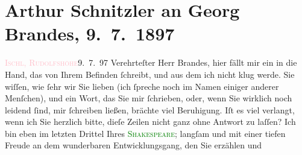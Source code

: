 

               \section[Arthur Schnitzler an Georg Brandes, 9. 7. 1897]{ Arthur Schnitzler an Georg Brandes, 9. 7. 1897}\nopagebreak{}\rehead{ }\normalsize\beginnumbering{} \toendnotes[C]{\smallbreak\pagebreak[2]} 
\toendnotes[C]{\smallbreak}\pstart
           \raggedleft{}{\pb}\textcolor{pink}{\textsc{Ischl, Rudolfshöhe}}{}\ledrightnote{\textcolor{pink}{Hotel und Pension Rudolfshöhe (Leopold Petter)}}{ }9. 7. 97\pend
           \pstart{}Verehrteſter Herr Brandes,\pend\pstart
           hier fällt mir ein \label{K_L00696_1v}\label{K_L00696_1h} in die Hand, das von Ihrem Befinden ſchreibt, und
                    aus dem ich nicht klug werde. Sie wiſſen, wie ſehr wir Sie lieben (ich ſpreche
                    noch im Namen einiger anderer Menſchen), und ein Wort, das Sie mir ſchrieben,
                    oder, wenn Sie wirklich noch lei{\pb}dend
                    ſind, mir ſchreiben ließen, brächte viel Beruhigung. Iſt es viel verlangt, wenn
                    ich Sie herzlich bitte, dieſe Zeilen nicht ganz ohne Antwort zu laſſen?\pend
           \pstart
           Ich \introOben{}bin\introOben{} eben im letzten Drittel Ihres \textcolor{green}{\textsc{Shakespeare}}{}\ledrightnote{\textcolor{green}{William Shakespeare}}; langſam und mit einer tiefen Freude an dem wunderbaren {\pb}Entwicklungsgang, den Sie erzählen und
